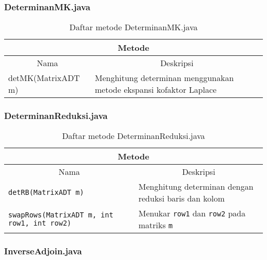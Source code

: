 \subsubsection{DeterminanMK.java}

\begin{table}[H]
    \centering
    \caption{Daftar metode DeterminanMK.java}
    \begin{tabular}{p{}|p{}}
        \hline
        \hline
        \multicolumn{2}{c}{\textbf{Metode}}\\
        \hline
        \hline
         \multicolumn{1}{c|}{Nama}  & \multicolumn{1}{c}{Deskripsi} \\
         \hline 
         \hline 
         detMK(MatrixADT m) & Menghitung determinan menggunakan metode ekspansi kofaktor Laplace 
    \end{tabular}
\end{table}

\subsubsection{DeterminanReduksi.java}

\begin{table}[H]
    \centering
    \caption{Daftar metode DeterminanReduksi.java}
    \begin{tabular}{p{}|p{}}
        \hline
        \hline
        \multicolumn{2}{c}{\textbf{Metode}}\\
        \hline
        \hline
         \multicolumn{1}{c|}{Nama}  & \multicolumn{1}{c}{Deskripsi} \\
         \hline 
         \hline 
         \verb|detRB(MatrixADT m)|      & Menghitung determinan dengan reduksi baris dan kolom \\[.5em]
         \verb+swapRows(MatrixADT m, int row1, int row2)+   & Menukar \verb+row1+ dan \verb+row2+ pada matriks \verb+m+
    \end{tabular}
\end{table}

\subsubsection{InverseAdjoin.java}


